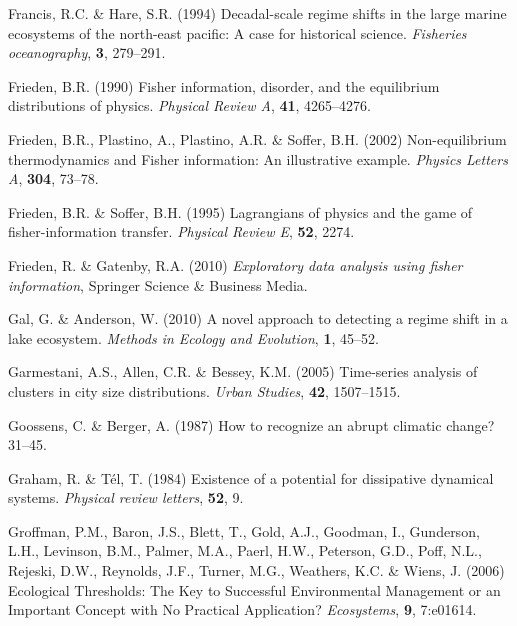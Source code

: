 \documentclass[12pt,twoside,openany]{reedthesis}
\begin{document}
\leavevmode\hypertarget{ref-francis1994decadal}{}%
Francis, R.C. \& Hare, S.R. (1994) Decadal-scale regime shifts in the large marine ecosystems of the north-east pacific: A case for historical science. \emph{Fisheries oceanography}, \textbf{3}, 279--291.

\leavevmode\hypertarget{ref-frieden_fisher_1990}{}%
Frieden, B.R. (1990) Fisher information, disorder, and the equilibrium distributions of physics. \emph{Physical Review A}, \textbf{41}, 4265--4276.

\leavevmode\hypertarget{ref-frieden_non-equilibrium_2002}{}%
Frieden, B.R., Plastino, A., Plastino, A.R. \& Soffer, B.H. (2002) Non-equilibrium thermodynamics and Fisher information: An illustrative example. \emph{Physics Letters A}, \textbf{304}, 73--78.

\leavevmode\hypertarget{ref-frieden1995lagrangians}{}%
Frieden, B.R. \& Soffer, B.H. (1995) Lagrangians of physics and the game of fisher-information transfer. \emph{Physical Review E}, \textbf{52}, 2274.

\leavevmode\hypertarget{ref-frieden_exploratory_2010}{}%
Frieden, R. \& Gatenby, R.A. (2010) \emph{Exploratory data analysis using fisher information}, Springer Science \& Business Media.

\leavevmode\hypertarget{ref-gal2010novel}{}%
Gal, G. \& Anderson, W. (2010) A novel approach to detecting a regime shift in a lake ecosystem. \emph{Methods in Ecology and Evolution}, \textbf{1}, 45--52.

\leavevmode\hypertarget{ref-garmestani2005time}{}%
Garmestani, A.S., Allen, C.R. \& Bessey, K.M. (2005) Time-series analysis of clusters in city size distributions. \emph{Urban Studies}, \textbf{42}, 1507--1515.

\leavevmode\hypertarget{ref-goossens1987recognize}{}%
Goossens, C. \& Berger, A. (1987) How to recognize an abrupt climatic change? 31--45.

\leavevmode\hypertarget{ref-graham1984existence}{}%
Graham, R. \& Tél, T. (1984) Existence of a potential for dissipative dynamical systems. \emph{Physical review letters}, \textbf{52}, 9.

\leavevmode\hypertarget{ref-groffman_ecological_2006}{}%
Groffman, P.M., Baron, J.S., Blett, T., Gold, A.J., Goodman, I., Gunderson, L.H., Levinson, B.M., Palmer, M.A., Paerl, H.W., Peterson, G.D., Poff, N.L., Rejeski, D.W., Reynolds, J.F., Turner, M.G., Weathers, K.C. \& Wiens, J. (2006) Ecological Thresholds: The Key to Successful Environmental Management or an Important Concept with No Practical Application? \emph{Ecosystems}, \textbf{9}, 7:e01614.
\end{document}
